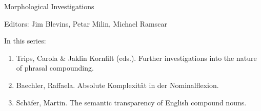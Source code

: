 {\large Morphological Investigations}

\bigskip

Editors: Jim Blevins, Petar Milin, Michael Ramscar  

\bigskip

In this series:

\begin{enumerate}
\item Trips, Carola \& Jaklin Kornfilt (eds.). Further investigations into the nature of phrasal compounding.
\item Baechler, Raffaela. Absolute Komplexität in der Nominalflexion.
\item Schäfer, Martin. The semantic transparency of English compound nouns.
\end{enumerate}